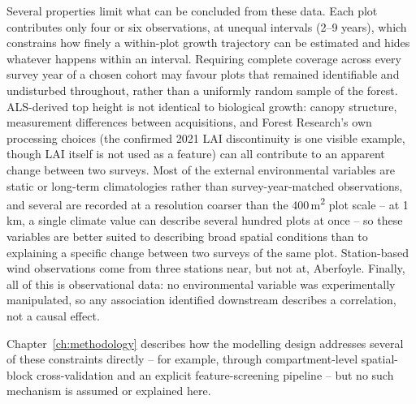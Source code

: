 Several properties limit what can be concluded from these data. Each plot contributes only four or
six observations, at unequal intervals (2--9 years), which constrains how finely a within-plot
growth trajectory can be estimated and hides whatever happens within an interval. Requiring
complete coverage across every survey year of a chosen cohort may favour plots that remained
identifiable and undisturbed throughout, rather than a uniformly random sample of the forest.
ALS-derived top height is not identical to biological growth: canopy structure, measurement
differences between acquisitions, and Forest Research's own processing choices (the confirmed 2021
LAI discontinuity is one visible example, though LAI itself is not used as a feature) can all
contribute to an apparent change between two surveys. Most of the external environmental variables
are static or long-term climatologies rather than survey-year-matched observations, and several
are recorded at a resolution coarser than the 400\,m\textsuperscript{2} plot scale -- at 1\,km, a
single climate value can describe several hundred plots at once -- so these variables are better
suited to describing broad spatial conditions than to explaining a specific change between two
surveys of the same plot. Station-based wind observations come from three stations near, but not
at, Aberfoyle. Finally, all of this is observational data: no environmental variable was
experimentally manipulated, so any association identified downstream describes a correlation, not
a causal effect.

Chapter~\ref{ch:methodology} describes how the modelling design addresses several of these
constraints directly -- for example, through compartment-level spatial-block cross-validation and
an explicit feature-screening pipeline -- but no such mechanism is assumed or explained here.
